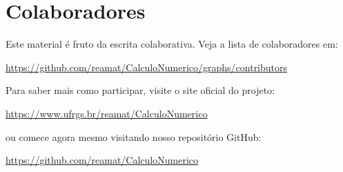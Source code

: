 
\chapter*{Colaboradores}
\fancyhead[LE,RO]{\thepage}

Este material é fruto da escrita colaborativa. Veja a lista de colaboradores em:
\begin{center}
  \url{https://github.com/reamat/CalculoNumerico/graphs/contributors}
\end{center}

Para saber mais como participar, visite o site oficial do projeto:
\begin{center}
  \url{https://www.ufrgs.br/reamat/CalculoNumerico}
\end{center}
ou comece agora mesmo visitando nosso repositório GitHub:
\begin{center}
  \url{https://github.com/reamat/CalculoNumerico}
\end{center}




